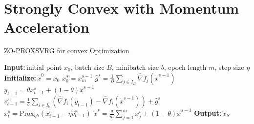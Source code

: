 \documentclass{article}
\newcommand*{\Po}{\text{Prox}}
\newcommand{\Initialize}{\textbf{Initialize:}{\,}}
\newcommand{\Input}{\textbf{Input:}{\,}}
\newcommand{\Output}{\textbf{Output:}{\,}}
\theoremstyle{definition}
\theoremstyle{remark}
\begin{document}
\section{Strongly Convex with Momentum Acceleration}
\begin{algorithm}\label{APGconvex-Algo}
\caption{ZO-PROXSVRG for convex Optimization}\begin{algorithmic}[1]
\State\Input initial point $x_0$, batch size $B$, minibatch size $b$, epoch length $m$, step size $\eta$
\State\Initialize $\tilde{x}^0 = x_0$
\State $x_0^s = {x}_m^{s-1}$
\State $\hat{g}^s = \frac{1}{B} \sum_{j\in I_B} \hat{\nabla} f_j (\widetilde{x}^{s-1})$
\State $y_{t-1} = \theta x_{t-1}^s+(1-\theta)\widetilde{x}^{s-1}$
\State ${v}_{t-1}^s = \frac{1}{b} \sum_{i\in I_b}\left(\hat{\nabla} f_{i}(y_{t-1})-\hat{\nabla} f_{i}(\tilde{x}^{s-1})\right)+\hat{g}^s$
\State $x_{t}^s= \Po_{\eta h}(x_{t-1}^s - \eta \hat{v}_{t-1}^s)$
\EndFor
\State $\tilde{x}^s=\frac{\theta}{m}\sum_{j=1}^{m}x_j^s + (1-\theta)\tilde{x}^{s-1}$ 
 \EndFor
 \State\Output ${\tilde{x}}_{S}$
\end{algorithmic}
\end{algorithm}
\end{document}
